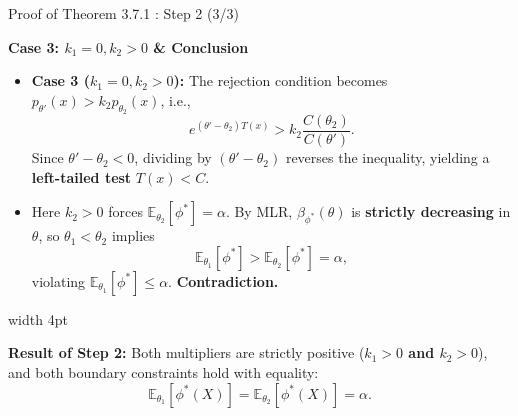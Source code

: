 \documentclass[10pt, aspectratio=169, xcolor=dvipsnames]{beamer}
\newcommand{\lead}[1]{{\color{UniBlue}\bfseries #1}}
\begin{document}
\begin{frame}{Proof of Theorem 3.7.1 : Step 2 (3/3)}
    
    \lead{Case 3: $k_1 = 0, k_2 > 0$ \& Conclusion}\\
    \vspace{0.2cm}
    
    \color{Slate}
    \begin{itemize}
        \setlength\itemsep{6pt}
        \item[\textcolor{Teal}{\textbullet}] \textbf{Case 3 ($k_1 = 0, k_2 > 0$):} The rejection condition becomes $p_{\theta'}(x) > k_2 p_{\theta_2}(x)$, i.e.,
        \[
            e^{(\theta' - \theta_2) T(x)} > k_2 \frac{C(\theta_2)}{C(\theta')}.
        \]
        Since $\theta' - \theta_2 < 0$, dividing by $(\theta' - \theta_2)$ reverses the inequality, yielding a \textbf{left-tailed test} $T(x) < C$.
        
        \item[\textcolor{Teal}{\textbullet}] Here $k_2 > 0$ forces $\mathbb{E}_{\theta_2}[\phi^*] = \alpha$. By MLR, $\beta_{\phi^*}(\theta)$ is \textbf{strictly decreasing} in $\theta$, so $\theta_1 < \theta_2$ implies
        \[
            \mathbb{E}_{\theta_1}[\phi^*] > \mathbb{E}_{\theta_2}[\phi^*] = \alpha,
        \]
        violating $\mathbb{E}_{\theta_1}[\phi^*] \le \alpha$. \textbf{Contradiction.}
    \end{itemize}
    
    \vspace{0.2cm}
    \noindent
    {\color{Teal}\vrule width 4pt}%
    \hspace{10pt}%
    \begin{minipage}{\dimexpr\textwidth-14pt\relax}
        \textbf{Result of Step 2:} Both multipliers are strictly positive (\textbf{$k_1 > 0$ and $k_2 > 0$}), and both boundary constraints hold with equality:
        \[
            \mathbb{E}_{\theta_1}[\phi^*(X)] = \mathbb{E}_{\theta_2}[\phi^*(X)] = \alpha.
        \]
    \end{minipage}
\end{frame}
\end{document}
